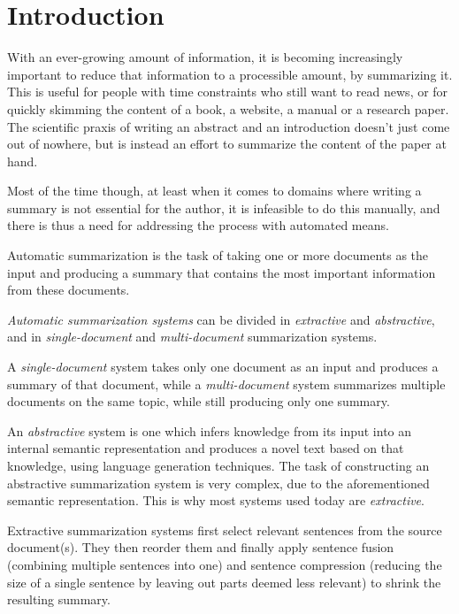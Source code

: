 \documentclass[a4paper,10pt]{scrartcl}
\theoremstyle{style}
\begin{document}
\newpage

\thispagestyle{empty}
\tableofcontents
\newpage

\setcounter{page}{1}		%
\newpage

\maketableofcontents

\section{Introduction}
With an ever-growing amount of information, it is becoming increasingly important to reduce that information to a processible amount, by summarizing it. This is useful for people with time constraints who still want to read news, or for quickly skimming the content of a book, a website, a manual or a research paper. The scientific praxis of writing an abstract and an introduction doesn't just come out of nowhere, but is instead an effort to summarize the content of the paper at hand.

Most of the time though, at least when it comes to domains where writing a summary is not essential for the author, it is infeasible to do this manually, and there is thus a need for addressing the process with automated means.

Automatic summarization is the task of taking one or more documents as the input and producing a summary that contains the most important information from these documents.

\textit{Automatic summarization systems} can be divided in \textit{extractive} and \textit{abstractive}, and in \textit{single-document} and \textit{multi-document} summarization systems.

A \textit{single-document} system takes only one document as an input and produces a summary of that document, while a \textit{multi-document} system summarizes multiple documents on the same topic, while still producing only one summary.

An \textit{abstractive} system is one which infers knowledge from its input into an internal semantic representation and produces a novel text based on that knowledge, using language generation techniques. The task of constructing an abstractive summarization system is very complex, due to the aforementioned semantic representation. This is why most systems used today are \textit{extractive}.

Extractive summarization systems first select relevant sentences from the source document(s). They then reorder them and finally apply sentence fusion (combining multiple sentences into one) and sentence compression (reducing the size of a single sentence by leaving out parts deemed less relevant) to shrink the resulting summary.
\end{document}
